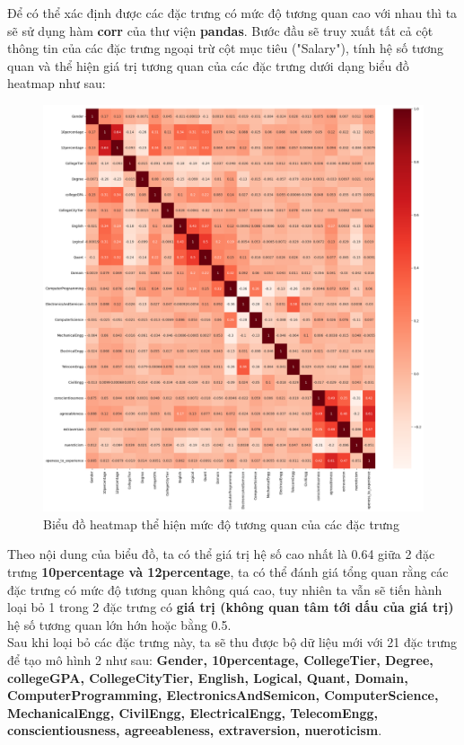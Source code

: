 \documentclass{report}
\begin{document}
    Để có thể xác định được các đặc trưng có mức độ tương quan cao với nhau thì ta sẽ sử dụng hàm \textbf{corr} của thư viện \textbf{pandas}. Bước đầu sẽ truy xuất tất cả cột thông tin của các đặc trưng ngoại trừ cột mục tiêu ("Salary"), tính hệ số tương quan và thể hiện giá trị tương quan của các đặc trưng dưới dạng biểu đồ heatmap như sau:
    \begin{figure}[H]
        \includegraphics[width=\textwidth, keepaspectratio]{assets/heatmap.png}
        \centering
        \caption{Biểu đồ heatmap thể hiện mức độ tương quan của các đặc trưng}
    \end{figure}

    Theo nội dung của biểu đồ, ta có thể  giá trị hệ số  cao nhất là 0.64 giữa 2 đặc trưng \textbf{10percentage và 12percentage}, ta có thể đánh giá tổng quan rằng các đặc trưng có mức độ tương quan không quá cao, tuy nhiên ta vẫn sẽ tiến hành loại bỏ 1 trong 2 đặc trưng có \textbf{giá trị (không quan tâm tới dấu của giá trị)} hệ số tương quan lớn hớn hoặc bằng 0.5.\\
    
    Sau khi loại bỏ các đặc trưng này, ta sẽ thu được bộ dữ liệu mới với 21 đặc trưng để tạo mô hình 2 như sau: \textbf{Gender, 10percentage, CollegeTier, Degree, collegeGPA, CollegeCityTier, English, Logical, Quant, Domain,
    ComputerProgramming, ElectronicsAndSemicon, ComputerScience, MechanicalEngg, CivilEngg, ElectricalEngg, TelecomEngg, conscientiousness, agreeableness, extraversion, nueroticism}.
\end{document}
